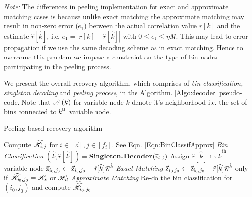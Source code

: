 {\it Note:} The differences in peeling implementation for exact and approximate matching cases is because unlike exact matching the approximate matching may result in non-zero error ($e_1$) between the actual correlation value $r[k]$ and the estimate $\hat{r}[\hat{k}]$, i.e. $e_1 = |r[k]- \hat{r}[\hat{k}]|$ with $0 \leq e_1 \leq \eta M$. This may lead to error propagation if we use the same decoding scheme as in exact matching. Hence to overcome this problem we impose a constraint on the type of bin nodes participating in the peeling process. 
	
We present the overall recovery algorithm, which comprises of {\it bin classification, singleton decoding} and {\it peeling process}, in the Algorithm. \ref{Algo:decoder} pseudo-code. Note that $\mathscr{N}(k)$ for variable node $k$ denote it's neighborhood i.e. the set of bins connected to $k^{\text{th}}$ variable node. 

\def\gap{4pt}
\begin{algorithm}[h!]
\caption{Peeling based recovery algorithm}
\label{Algo:decoder}
\begin{algorithmic}
\State Compute $\widehat{\mathscr{H}}_{i,j}$ for $i\in[d], j\in[f_i]$. See Eqn. \eqref{Eqn:BinClassifApprox} \hspace{26.5ex} {\it Bin Classification}
\vspace{\gap}
\vspace{\gap}
  \State $(\hat{k},\hat{r}[\hat{k}])=${\bf Singleton-Decoder}$(\vec{\mathrm{z}}_{i,j})$
\vspace{\gap}
  \State Assign $\hat{r}[\hat{k}]$ to $\hat{k}^{\text{th}}$ variable node
\vspace{1.5\gap}
\vspace{\gap}
	   \State $\vec{\mathrm{z}}_{i_0,j_0}\gets\vec{\mathrm{z}}_{i_0,j_0}-\hat{r}[\hat{k}]\vec{\mathrm{w}}^{\hat{k}}$   \hspace{45.5ex} {\it Exact Matching}
	   \vspace{\gap}
	   \State $\vec{\mathrm{z}}_{i_0,j_0}\gets\vec{\mathrm{z}}_{i_0,j_0}-\hat{r}[\hat{k}]\vec{\mathrm{w}}^{\hat{k}}$   \hspace{6ex} only if $\widehat{\mathscr{H}}_{i_0,j_0}=\mathscr{H}_s$ or $\mathscr{H}_d$ \hspace{14ex} {\it Approximate Matching}
	   \vspace{\gap}
	   \State Re-do the bin classification for $(i_0,j_0)$ and compute $\widehat{\mathscr{H}}_{i_0,j_0}$
      \EndFor
\EndWhile
\end{algorithmic}
\end{algorithm}

